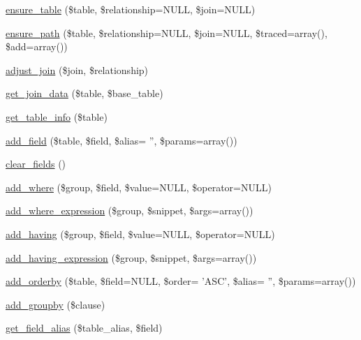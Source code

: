 \begin{DoxyCompactItemize}
\item 
\hyperlink{classviews__plugin__query__default_add3d47f9225b13269e9f51d9013d8970}{ensure\_\-table} (\$table, \$relationship=NULL, \$join=NULL)
\item 
\hyperlink{classviews__plugin__query__default_accfbae81f0baa64215da42dfc9ce14ee}{ensure\_\-path} (\$table, \$relationship=NULL, \$join=NULL, \$traced=array(), \$add=array())
\item 
\hyperlink{classviews__plugin__query__default_ac006f3847c96aa588b08b1072c36f939}{adjust\_\-join} (\$join, \$relationship)
\item 
\hyperlink{classviews__plugin__query__default_a60d456b86d39fad9ffc9acedde13201d}{get\_\-join\_\-data} (\$table, \$base\_\-table)
\item 
\hyperlink{classviews__plugin__query__default_a67c7184eec8e3bb6a913e52696bd2c35}{get\_\-table\_\-info} (\$table)
\item 
\hyperlink{classviews__plugin__query__default_afeb9c22de8c015682431b41288248dbb}{add\_\-field} (\$table, \$field, \$alias= '', \$params=array())
\item 
\hyperlink{classviews__plugin__query__default_a4668bd51fabda2e6f8045508a514027d}{clear\_\-fields} ()
\item 
\hyperlink{classviews__plugin__query__default_a5a70ca8325494614f66096a38b8625d7}{add\_\-where} (\$group, \$field, \$value=NULL, \$operator=NULL)
\item 
\hyperlink{classviews__plugin__query__default_ae44670637e83514a8fc472190397e51d}{add\_\-where\_\-expression} (\$group, \$snippet, \$args=array())
\item 
\hyperlink{classviews__plugin__query__default_a0c4fadff80c1a7df79b6fc286bf36a70}{add\_\-having} (\$group, \$field, \$value=NULL, \$operator=NULL)
\item 
\hyperlink{classviews__plugin__query__default_a04031a4ad7be93ad612c37e09596e814}{add\_\-having\_\-expression} (\$group, \$snippet, \$args=array())
\item 
\hyperlink{classviews__plugin__query__default_a7741425c0113d4bffb0e27266346a4d6}{add\_\-orderby} (\$table, \$field=NULL, \$order= 'ASC', \$alias= '', \$params=array())
\item 
\hyperlink{classviews__plugin__query__default_a3bf2adad02c8f1246cda9d200c09a750}{add\_\-groupby} (\$clause)
\item 
\hyperlink{classviews__plugin__query__default_a1861c9cb9fd6ed490a35dfb8b6bbe119}{get\_\-field\_\-alias} (\$table\_\-alias, \$field)
\item 

\end{DoxyCompactItemize}

